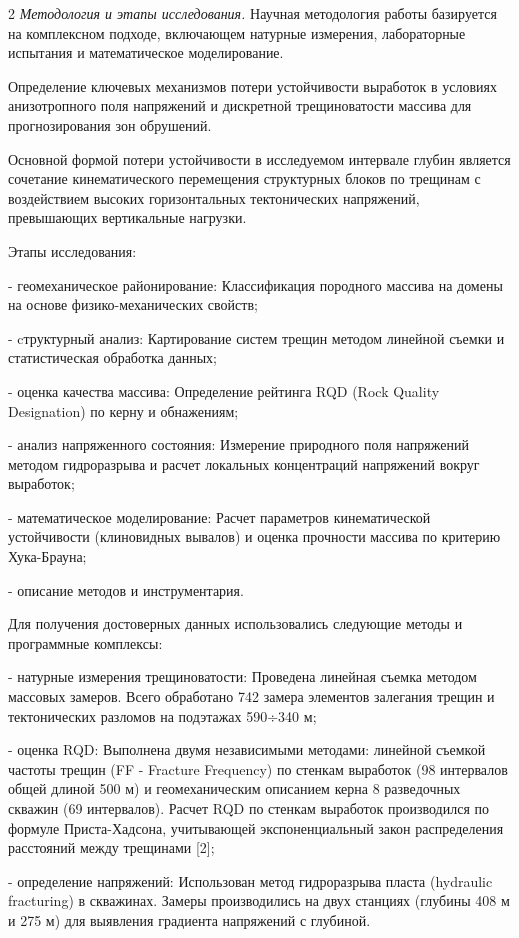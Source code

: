 \begin{multicols}{2}
\emph{Методология и этапы исследования.} Научная методология работы
базируется на комплексном подходе, включающем натурные измерения,
лабораторные испытания и математическое моделирование.

Определение ключевых механизмов потери устойчивости выработок в условиях
анизотропного поля напряжений и дискретной трещиноватости массива для
прогнозирования зон обрушений.

Основной формой потери устойчивости в исследуемом интервале глубин
является сочетание кинематического перемещения структурных блоков по
трещинам с воздействием высоких горизонтальных тектонических напряжений,
превышающих вертикальные нагрузки.

Этапы исследования:

- геомеханическое районирование: Классификация породного массива на
домены на основе физико-механических свойств;

- cтруктурный анализ: Картирование систем трещин методом линейной съемки
и статистическая обработка данных;

- оценка качества массива: Определение рейтинга RQD (Rock Quality
Designation) по керну и обнажениям;

- анализ напряженного состояния: Измерение природного поля напряжений
методом гидроразрыва и расчет локальных концентраций напряжений вокруг
выработок;

- математическое моделирование: Расчет параметров кинематической
устойчивости (клиновидных вывалов) и оценка прочности массива по
критерию Хука-Брауна;

- описание методов и инструментария.

Для получения достоверных данных использовались следующие методы и
программные комплексы:

- натурные измерения трещиноватости: Проведена линейная съемка методом
массовых замеров. Всего обработано 742 замера элементов залегания трещин
и тектонических разломов на подэтажах 590÷340 м;

- оценка RQD: Выполнена двумя независимыми методами: линейной съемкой
частоты трещин (FF - Fracture Frequency) по стенкам выработок (98
интервалов общей длиной 500 м) и геомеханическим описанием керна 8
разведочных скважин (69 интервалов). Расчет RQD по стенкам выработок
производился по формуле Приста-Хадсона, учитывающей экспоненциальный
закон распределения расстояний между трещинами {[}2{]};

- определение напряжений: Использован метод гидроразрыва пласта
(hydraulic fracturing) в скважинах. Замеры производились на двух
станциях (глубины 408 м и 275 м) для выявления градиента напряжений с
глубиной.


\end{multicols}
